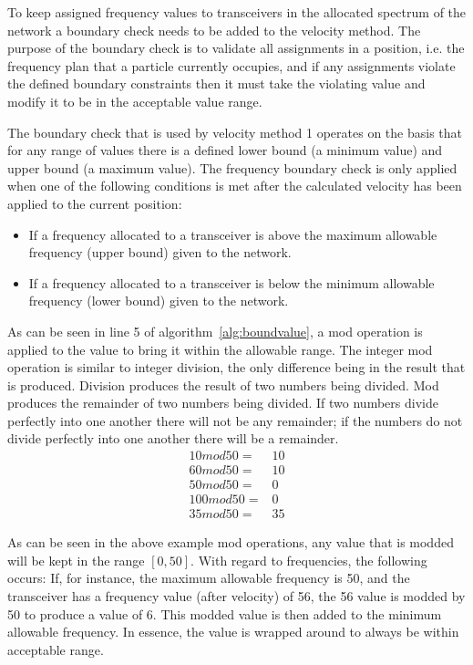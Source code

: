 To keep assigned frequency values to transceivers in the allocated spectrum of the network a boundary check needs to be added to the velocity method. The purpose of the boundary check is to validate all assignments in a position, i.e. the frequency plan that a particle currently occupies, and if any assignments violate the defined boundary constraints then it must take the violating value and modify it to be in the acceptable value range.

The boundary check that is used by velocity method 1 operates on the basis that for any range of values there is a defined lower bound (a minimum value) and upper bound (a maximum value). The frequency boundary check is only applied when one of the following conditions is met after the calculated velocity has been applied to the current position:
\begin{itemize}
\item If a frequency allocated to a transceiver is above the maximum allowable frequency (upper bound) given to the network. 
\item If a frequency allocated to a transceiver is below the minimum allowable frequency (lower bound) given to the network.
\end{itemize}

As can be seen in line 5 of algorithm~\ref{alg:boundvalue}, a mod operation is applied to the value to bring it within the allowable range. The integer mod operation is similar to integer division, the only difference being in the result that is produced. Division produces the result of two numbers being divided. Mod produces the remainder of two numbers being divided. If two numbers divide perfectly into one another there will not be any remainder; if the numbers do not divide perfectly into one another there will be a remainder. 
\begin{align}
	10 mod 50 =& 10 \\
	60 mod 50 =& 10 \\
	50 mod 50 =& 0 \\
	100 mod 50 =& 0 \\
	35 mod 50 =& 35 
\end{align}

As can be seen in the above example mod operations, any value that is modded will be kept in the range $[0,50]$. With regard to frequencies, the following occurs: If, for instance, the maximum allowable frequency is 50, and the transceiver has a frequency value (after velocity) of 56, the 56 value is modded by 50 to produce a value of 6. This modded value is then added to the minimum allowable frequency. In essence, the value is wrapped around to always be within acceptable range. 

